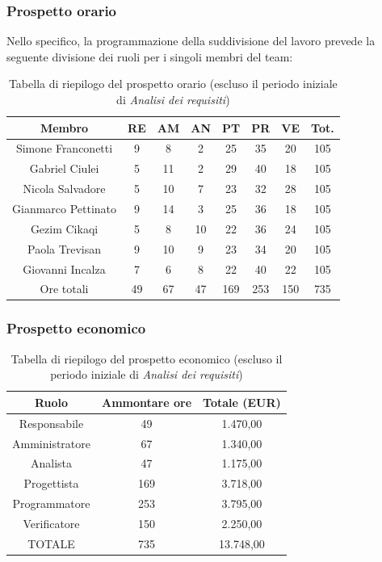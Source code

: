 \subsubsection{Prospetto orario}
Nello specifico, la programmazione della suddivisione del lavoro prevede la seguente divisione dei ruoli per i singoli membri del team:
\begin{table}[h]
	\caption{Tabella di riepilogo del prospetto orario (escluso il periodo iniziale di \textit{Analisi dei requisiti})}
\begin{center}
\begin{tabular}{ |c|c|c|c|c|c|c|c|  }
 \hline
 Membro 		& RE 		& AM 		& AN 	& PT 	& PR 	& VE 	& Tot.\\
 \hline\hline
 Simone	Franconetti		& 9  	 	& 8			& 2 		& 25 		& 35 		& 20 		& 105\\
 Gabriel Ciulei		& 5 			& 11 		& 2 		& 29			& 40 		& 18 		& 105\\
 Nicola	Salvadore		& 5  		& 10 		& 7 		& 23 		& 32 		& 28 		& 105\\
 Gianmarco	Pettinato	& 9   		& 14 		& 3 		& 25		 	& 36 		& 18 		& 105\\
 Gezim	Cikaqi		& 5  		& 8  		& 10		& 22 		& 36 		& 24	 	& 105\\
 Paola	Trevisan		& 9  		& 10 		& 9 		& 23 		& 34 		& 20 		& 105\\
 Giovanni	Incalza	& 7  		& 6	 		& 8 		& 22 		& 40		 	& 22  		& 105\\
 \hline\hline
 Ore totali		& 49 	& 67		& 47 	& 169 	& 253 	& 150 	& 735\\
  \hline
\end{tabular}
\end{center}
\end{table}

\newpage
\subsubsection{Prospetto economico}
\begin{table}[h]
	\caption{Tabella di riepilogo del prospetto economico (escluso il periodo iniziale di \textit{Analisi dei requisiti})}
	\begin{center}
		\begin{tabular}{ |c|c|c|  }
			\hline
			Ruolo 		& Ammontare ore 	& Totale (EUR)\\
			\hline
			\hline
			Responsabile	& 49 	& 1.470,00\\
			Amministratore	& 67		& 1.340,00\\
			Analista		& 47 	& 1.175,00\\
			Progettista		& 169	& 3.718,00\\
			Programmatore	& 253	& 3.795,00\\
			Verificatore	& 150 	& 2.250,00\\
			\hline\hline
			TOTALE		& 735		& 13.748,00\\
			\hline
		\end{tabular}
	\end{center}
\end{table}

